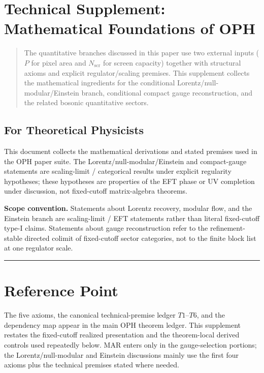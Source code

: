 \section{Technical Supplement: Mathematical Foundations of OPH}\label{technical-supplement-mathematical-foundations-of-observer-patch-holography}

\begin{quote}
The quantitative branches discussed in this paper use two external inputs (\(P\) for pixel area and \(N_{\mathrm{scr}}\) for screen capacity) together with structural axioms and explicit regulator/scaling premises. This supplement collects the mathematical ingredients for the conditional Lorentz/null-modular/Einstein branch, conditional compact gauge reconstruction, and the related bosonic quantitative sectors.
\end{quote}

\subsection{For Theoretical Physicists}\label{for-theoretical-physicists}

This document collects the mathematical derivations and stated premises used in the OPH paper suite. The Lorentz/null-modular/Einstein and compact-gauge statements are scaling-limit / categorical results under explicit regularity hypotheses; these hypotheses are properties of the EFT phase or UV completion under discussion, not fixed-cutoff matrix-algebra theorems.

\textbf{Scope convention.} Statements about Lorentz recovery, modular flow, and the Einstein branch are scaling-limit / EFT statements rather than literal fixed-cutoff type-I claims. Statements about gauge reconstruction refer to the refinement-stable directed colimit of fixed-cutoff sector categories, not to the finite block list at one regulator scale.

\begin{center}\rule{0.5\linewidth}{0.5pt}\end{center}

\section{Reference Point}\label{1-core-axioms-and-definitions}

The five axioms, the canonical technical-premise ledger \(T1\)--\(T6\), and the dependency map appear in the main OPH theorem ledger. This supplement restates the fixed-cutoff realized presentation and the theorem-local derived controls used repeatedly below. MAR enters only in the gauge-selection portions; the Lorentz/null-modular and Einstein discussions mainly use the first four axioms plus the technical premises stated where needed.

